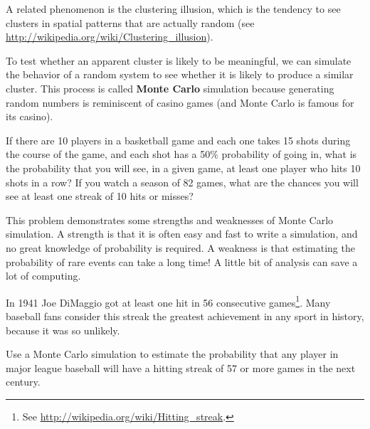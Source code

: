 \documentclass[12pt]{book}
\begin{document}
A related phenomenon is the clustering illusion, which is the
tendency to see clusters in spatial patterns that are actually
random (see \url{http://wikipedia.org/wiki/Clustering_illusion}).

To test whether an apparent
cluster is likely to be meaningful, we can simulate the behavior
of a random system to see whether it is likely to produce a similar
cluster.  This process is called {\bf Monte Carlo} simulation because
generating random numbers is reminiscent of casino games (and Monte
Carlo is famous for its casino).

\begin{exercise}
If there are 10 players in a basketball game and each one takes
15 shots during the course of the game, and each shot has a
50\% probability of going in, what is the probability that 
you will see, in a given game, at least one player who
hits 10 shots in a row?  If you watch a season of 82 games,
what are the chances you will see at least one streak of
10 hits or misses?

This problem demonstrates some strengths and weaknesses of Monte
Carlo simulation.  A strength is that it is often easy and fast
to write a simulation, and no great knowledge of probability is
required.  A weakness is that estimating the probability of
rare events can take a long time!  A little bit of analysis can
save a lot of computing.

\end{exercise}


\begin{exercise}
In 1941 Joe DiMaggio got at least one hit
in 56 consecutive games\footnote{See
  \url{http://wikipedia.org/wiki/Hitting_streak}.}.  Many baseball fans
consider this streak the greatest achievement in any sport in history,
because it was so unlikely.

Use a Monte Carlo simulation to estimate the probability that
any player in major league baseball will have a hitting streak
of 57 or more games in the next century.

\end{exercise}
\end{document}
